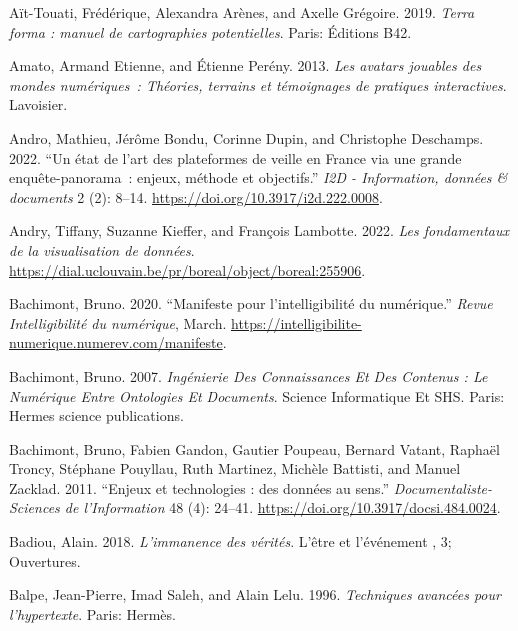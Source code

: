 \documentclass[
  letterpaper,
  DIV=11,
  numbers=noendperiod]{scrreprt}
\newlength{\cslhangindent}
\newlength{\cslentryspacingunit} %
\newenvironment{CSLReferences}[2] %
 {%
  \setlength{\parindent}{0pt}
  \ifodd #1
  \let\oldpar\par
  \def\par{\hangindent=\cslhangindent\oldpar}
  \fi
  \setlength{\parskip}{#2\cslentryspacingunit}
 }%
 {}
\begin{document}
\hypertarget{refs}{}
\begin{CSLReferences}{1}{0}
\leavevmode{}%
Aït-Touati, Frédérique, Alexandra Arènes, and Axelle Grégoire. 2019.
\emph{Terra forma : manuel de cartographies potentielles}. Paris:
Éditions B42.

\leavevmode{}%
Amato, Armand Etienne, and Étienne Perény. 2013. \emph{Les avatars
jouables des mondes numériques~: Théories, terrains et témoignages de
pratiques interactives}. Lavoisier.

\leavevmode{}%
Andro, Mathieu, Jérôme Bondu, Corinne Dupin, and Christophe Deschamps.
2022. {``Un état de l{'}art des plateformes de veille en France via une
grande enquête-panorama~: enjeux, méthode et objectifs.''} \emph{I2D -
Information, données \& documents} 2 (2): 8--14.
\url{https://doi.org/10.3917/i2d.222.0008}.

\leavevmode{}%
Andry, Tiffany, Suzanne Kieffer, and François Lambotte. 2022. \emph{Les
fondamentaux de la visualisation de données}.
\url{https://dial.uclouvain.be/pr/boreal/object/boreal:255906}.

\leavevmode{}%
Bachimont, Bruno. 2020. {``Manifeste pour l'intelligibilité du
numérique.''} \emph{Revue Intelligibilité du numérique}, March.
\url{https://intelligibilite-numerique.numerev.com/manifeste}.

\leavevmode{}%
Bachimont, Bruno. 2007. \emph{Ingénierie Des Connaissances Et Des
Contenus : Le Numérique Entre Ontologies Et Documents}. Science
Informatique Et SHS. Paris: Hermes science publications.

\leavevmode{}%
Bachimont, Bruno, Fabien Gandon, Gautier Poupeau, Bernard Vatant,
Raphaël Troncy, Stéphane Pouyllau, Ruth Martinez, Michèle Battisti, and
Manuel Zacklad. 2011. {``Enjeux et technologies : des données au
sens.''} \emph{Documentaliste-Sciences de l'Information} 48 (4): 24--41.
\url{https://doi.org/10.3917/docsi.484.0024}.

\leavevmode{}%
Badiou, Alain. 2018. \emph{L'immanence des vérités}. L'être et
l'événement , 3; Ouvertures.

\leavevmode{}%
Balpe, Jean-Pierre, Imad Saleh, and Alain Lelu. 1996. \emph{Techniques
avancées pour l'hypertexte}. Paris: Hermès.


\end{CSLReferences}
\end{document}
